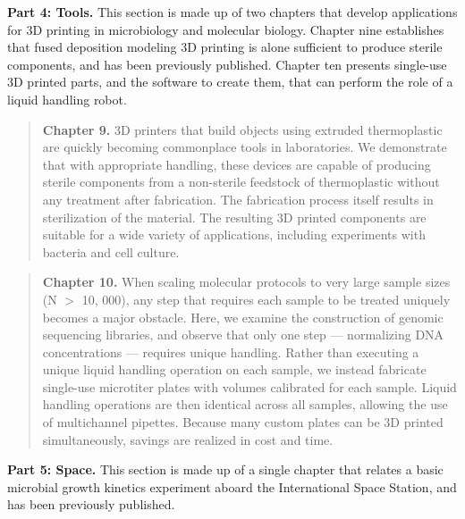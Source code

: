 \noindent\textbf{Part 4: Tools.}
This section is made up of two chapters that develop applications for 3D printing in microbiology and molecular biology. Chapter nine establishes that fused deposition modeling 3D printing is alone sufficient to produce sterile components, and has been previously published. \cite{neches2016intrinsic} Chapter ten presents single-use 3D printed parts, and the software to create them, that can perform the role of a liquid handling robot.

\begin{quote} \noindent\textbf{Chapter 9.} 3D printers that build objects
using extruded thermoplastic are quickly becoming commonplace tools in
laboratories. We demonstrate that with appropriate handling, these devices are
capable of producing sterile components from a non-sterile feedstock of
thermoplastic without any treatment after fabrication. The fabrication process
itself results in sterilization of the material. The resulting 3D printed
components are suitable for a wide variety of applications, including
experiments with bacteria and cell culture. \end{quote}

\begin{quote} \noindent\textbf{Chapter 10.} When scaling molecular protocols
to very large sample sizes (N $>$ 10, 000), any step that requires each sample
to be treated uniquely becomes a major obstacle. Here, we examine the
construction of genomic sequencing libraries, and observe that only one step
--- normalizing DNA concentrations --- requires unique handling. Rather than
executing a unique liquid handling operation on each sample, we instead
fabricate single-use microtiter plates with volumes calibrated for each
sample. Liquid handling operations are then identical across all samples,
allowing the use of multichannel pipettes. Because many custom plates can be
3D printed simultaneously, savings are realized in cost and time. \end{quote}

\noindent\textbf{Part 5: Space.}
This section is made up of a single chapter that relates a basic microbial growth kinetics experiment aboard the International Space Station, and has been previously published. \cite{coil2016growth}

